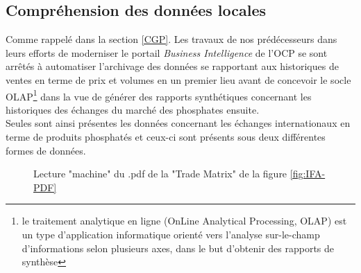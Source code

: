 	\subsection{Compréhension des données locales}\label{humanpdf}
	Comme rappelé dans la section \ref{CGP}. Les travaux de nos prédécesseurs dans leurs efforts de moderniser le portail \textit{Business Intelligence} de l'OCP se sont arrêtés à automatiser l'archivage des données se rapportant aux historiques de ventes en terme de prix et volumes en un premier lieu\cite{CHEMLAL} avant de concevoir le socle OLAP\footnote{le traitement analytique en ligne (OnLine Analytical Processing, OLAP) est un type d'application informatique orienté vers l'analyse sur-le-champ d'informations selon plusieurs axes, dans le but d'obtenir des rapports de synthèse} dans la vue de générer des rapports synthétiques concernant les historiques des échanges du marché des phosphates ensuite\cite{NACER}.\\
	Seules sont ainsi présentes les données concernant les échanges internationaux en terme de produits phosphatés et ceux-ci sont présents sous deux différentes formes de données.
					\begin{figure}
						\raggedleft
						\raggedleft
						\caption{Lecture "machine" du .pdf de la "Trade Matrix" de la figure \ref{fig:IFA-PDF}}
						\label{fig:IFA-TXT}
					\end{figure}

